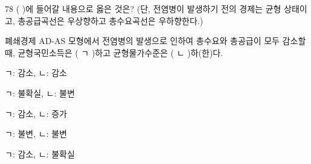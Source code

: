 \begin{question}{78}
( )에 들어갈 내용으로 옳은 것은? (단, 전염병이 발생하기 전의 경제는 균형 상태이고, 총공급곡선은 우상향하고 총수요곡선은 우하향한다.)
\begin{framedtext}
폐쇄경제 AD-AS 모형에서 전염병의 발생으로 인하여 총수요와 총공급이 모두 감소할 때, 균형국민소득은 ( ㄱ )하고 균형물가수준은 ( ㄴ )하(한)다.
\end{framedtext}
\begin{choices}
  \item ㄱ: 감소, ㄴ: 감소
  \item ㄱ: 불확실, ㄴ: 불변
  \item ㄱ: 감소, ㄴ: 증가
  \item ㄱ: 불변, ㄴ: 불변
  \item ㄱ: 감소, ㄴ: 불확실
\end{choices}
\end{question}
